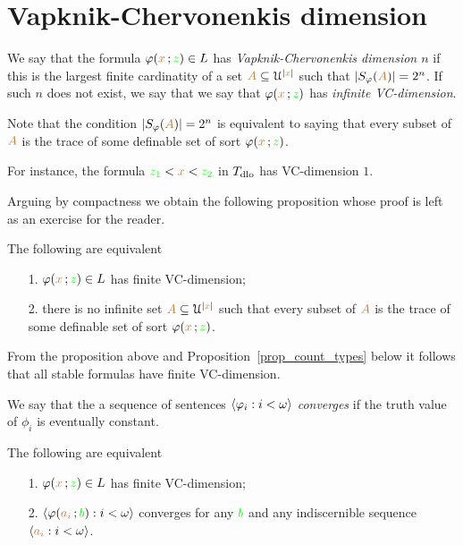 \documentclass[creche.tex]{subfiles}
\begin{document}
\section{Vapknik-Chervonenkis dimension}
\label{sectionVC}

\def\ceq#1#2#3{\parbox{25ex}{$\displaystyle #1$}\medrel{#2}$\displaystyle  #3$}

We say that the formula $\varphi({\color{brown} x}\,;{\color{green} z})\in L$ has \emph{Vapknik-Chervonenkis dimension $n$\/} if this is the largest finite cardinatity of a set ${\color{brown} A}\subseteq\EuScript U^{|{\color{brown} x}|}$ such that $|S_\varphi({\color{brown} A})|=2^n$. If such $n$ does not exist, we say that we say that  $\varphi({\color{brown} x}\,;{\color{green} z})$ has \emph{infinite VC-dimension}. 

Note that the condition $|S_\varphi({\color{brown} A})|=2^n$ is equivalent to saying that every subset of ${\color{brown} A}$ is the trace of some definable set of sort $\varphi({\color{brown} x}\,;{\color{green} z})$.

For instance, the formula ${\color{green} z_1}<{\color{brown} x}<{\color{green} z_2}$ in $T_{\rm dlo}$ has VC-dimension $1$.

Arguing by compactness we obtain the following proposition whose proof is left as an exercise for the reader.

\begin{proposition}
The following are equivalent 
\begin{itemize}
\item[1.] $\varphi({\color{brown} x}\,;{\color{green} z})\in L$ has finite VC-dimension;
\item[2.] there is no infinite set ${\color{brown} A}\subseteq\EuScript U^{|{\color{brown} x}|}$ such that every subset of ${\color{brown} A}$ is the trace of some definable set of sort $\varphi({\color{brown} x}\,;{\color{green} z})$.\QED
\end{itemize}
\end{proposition}

From the proposition above and Proposition~\ref{prop_count_types} below it follows that all stable formulas have finite VC-dimension.

We say that the a sequence of sentences $\langle\varphi_i:i<\omega\rangle$ \emph{converges\/} if the truth value of $\phi_i$ is eventually constant.

\begin{lemma}\label{lem_altrank}
The following are equivalent
\begin{itemize}
\item[1.] $\varphi({\color{brown} x}\,;{\color{green} z})\in L$ has finite VC-dimension;
\item[2.] $\langle\varphi({\color{brown} a_i}\,;{\color{green} b}):i<\omega\rangle$ converges for any ${\color{green} b}$ and any indiscernible sequence $\langle{\color{brown}a_i}:i<\omega\rangle$.
\end{itemize}
\end{lemma}
\end{document}
